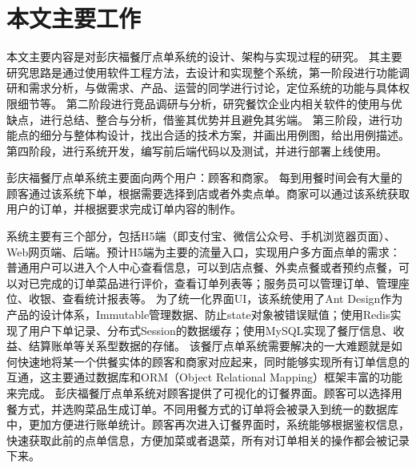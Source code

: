 






\section{本文主要工作}
本文主要内容是对彭庆福餐厅点单系统的设计、架构与实现过程的研究。
其主要研究思路是通过使用软件工程方法，去设计和实现整个系统，第一阶段进行功能调研和需求分析，与做需求、产品、运营的同学进行讨论，定位系统的功能与具体权限细节等。
第二阶段进行竞品调研与分析，研究餐饮企业内相关软件的使用与优缺点，进行总结、整合与分析，借鉴其优势并且避免其劣端。
第三阶段，进行功能点的细分与整体构设计，找出合适的技术方案，并画出用例图，给出用例描述。
第四阶段，进行系统开发，编写前后端代码以及测试，并进行部署上线使用。 

彭庆福餐厅点单系统主要面向两个用户：顾客和商家。
每到用餐时间会有大量的顾客通过该系统下单，根据需要选择到店或者外卖点单。商家可以通过该系统获取用户的订单，并根据要求完成订单内容的制作。 

系统主要有三个部分，包括H5端（即支付宝、微信公众号、手机浏览器页面）、Web网页端、后端。预计H5端为主要的流量入口，实现用户多方面点单的需求：普通用户可以进入个人中心查看信息，可以到店点餐、外卖点餐或者预约点餐，可以对已完成的订单菜品进行评价，查看订单列表等；服务员可以管理订单、管理座位、收银、查看统计报表等。
为了统一化界面UI，该系统使用了Ant Design作为产品的设计体系，Immutable管理数据、防止state对象被错误赋值；使用Redis实现了用户下单记录、分布式Session的数据缓存；使用MySQL实现了餐厅信息、收益、结算账单等关系型数据的存储。
该餐厅点单系统需要解决的一大难题就是如何快速地将某一个供餐实体的顾客和商家对应起来，同时能够实现所有订单信息的互通，这主要通过数据库和ORM（Object Relational Mapping）框架丰富的功能来完成。
彭庆福餐厅点单系统对顾客提供了可视化的订餐界面。顾客可以选择用餐方式，并选购菜品生成订单。不同用餐方式的订单将会被录入到统一的数据库中，更加方便进行账单统计。顾客再次进入订餐界面时，系统能够根据鉴权信息，快速获取此前的点单信息，方便加菜或者退菜，所有对订单相关的操作都会被记录下来。 

